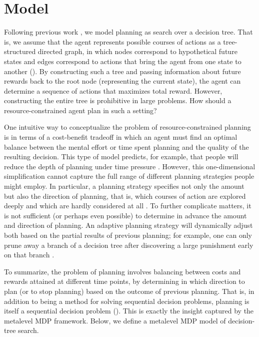 \section{Model}\label{sec:planning-model}

Following previous work \citep{huys2012bonsai,huys2015interplay,vanopheusden2017computational,sezener2019optimizing}, we model planning as search over a decision tree. That is, we assume that the agent represents possible courses of actions as a tree-structured directed graph, in which nodes correspond to hypothetical future states and edges correspond to actions that bring the agent from one state to another (). By constructing such a tree and passing information about future rewards back to the root node (representing the current state), the agent can determine a sequence of actions that maximizes total reward. However, constructing the entire tree is prohibitive in large problems. How should a resource-constrained agent plan in such a setting?

One intuitive way to conceptualize the problem of resource-constrained planning is in terms of a cost-benefit tradeoff \citep{daw2005uncertaintybased,keramati2011speed,shenhav2013expected,kool2017costbenefit,kool2018mental} in which an agent must find an optimal balance between the mental effort or time spent planning and the quality of the resulting decision. This type of model predicts, for example, that people will reduce the depth of planning under time pressure \citep{keramati2016adaptive}. However, this one-dimensional simplification cannot capture the full range of different planning strategies people might employ. In particular, a planning strategy specifies not only the amount but also the direction of planning, that is, which courses of action are explored deeply and which are hardly considered at all \citep{sezener2019optimizing}. To further complicate matters, it is not sufficient (or perhaps even possible) to determine in advance the amount and direction of planning. An adaptive planning strategy will dynamically adjust both based on the partial results of previous planning; for example, one can only prune away a branch of a decision tree after discovering a large punishment early on that branch \citep{huys2012bonsai}.

To summarize, the problem of planning involves balancing between costs and rewards attained at different time points, by determining in which direction to plan (or to stop planning) based on the outcome of previous planning. That is, in addition to being a method for solving sequential decision problems, planning is itself a sequential decision problem (). This is exactly the insight captured by the metalevel MDP framework. Below, we define a metalevel MDP model of decision-tree search.

